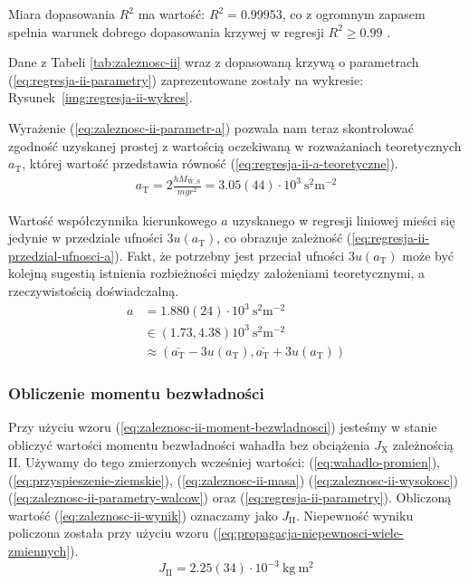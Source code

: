 \documentclass[twocolumn, a4paper, polish, 10pt]{article}
\newcommand{\JX}{\ensuremath{ J_{\mathrm{X}} }}
\newcommand{\JXn}[1]{\ensuremath{ J_{\mathrm{#1}} }}
\newcommand{\MWS}{\ensuremath{ M_{\mathrm{W,S}} }}
\begin{document}
Miara dopasowania $R^2$ ma wartość: $R^2 = 0.99953$, co z ogromnym zapasem spełnia warunek dobrego dopasowania krzywej w regresji $R^2 \geq 0.99$ \cite{epa-8000d}.

Dane z Tabeli \ref{tab:zaleznosc-ii} wraz z dopasowaną krzywą o parametrach (\ref{eq:regresja-ii-parametry}) zaprezentowane zostały na wykresie: Rysunek~\ref{img:regresja-ii-wykres}.


Wyrażenie (\ref{eq:zaleznosc-ii-parametr-a}) pozwala nam teraz skontrolować zgodność uzyskanej prostej z wartością oczekiwaną w rozważaniach teoretycznych $a_{\mathrm{T}}$, której wartość przedstawia równość (\ref{eq:regresja-ii-a-teoretyczne}).
\begin{equation}
\begin{split}
    a_{\mathrm{T}} = 2 \frac{h \MWS}{m g r^2} = 3.05(44) \cdot 10^3~\mathrm{ s^2 m^{-2} }
    \label{eq:regresja-ii-a-teoretyczne}
\end{split}
\end{equation}

Wartość współczynnika kierunkowego $a$ uzyskanego w regresji liniowej mieści się jedynie w przedziale ufności $3u(a_{\mathrm{T}})$, co obrazuje zależność (\ref{eq:regresja-ii-przedzial-ufnosci-a}). Fakt, że potrzebny jest przeciał ufności $3u(a_{\mathrm{T}})$ może być kolejną sugestią istnienia rozbieżności między założeniami teoretycznymi, a rzeczywistością doświadczalną.
\begin{equation}
\begin{split}
    a &= 1.880(24) \cdot 10^3~\mathrm{ s^2 m^{-2} } \\
    &\in \left( 1.73, 4.38 \right) 10^3~\mathrm{ s^2 m^{-2} } \\
    &\approx \left(
        \bar{a_{\mathrm{T}}} - 3 u(a_{\mathrm{T}}),
        \bar{a_{\mathrm{T}}} + 3 u(a_{\mathrm{T}})
    \right)
    \label{eq:regresja-ii-przedzial-ufnosci-a}
\end{split}
\end{equation}

\subsubsection{Obliczenie momentu bezwładności}
Przy użyciu wzoru (\ref{eq:zaleznosc-ii-moment-bezwladnosci}) jesteśmy w stanie obliczyć wartości momentu bezwładności wahadła bez obciążenia $\JX$ zależnością II. Używamy do tego zmierzonych wcześniej wartości: (\ref{eq:wahadlo-promien}),
(\ref{eq:przyspieszenie-ziemskie}),
(\ref{eq:zaleznosc-ii-masa})
(\ref{eq:zaleznosc-ii-wysokosc})
(\ref{eq:zaleznosc-ii-parametry-walcow}) oraz
(\ref{eq:regresja-ii-parametry}).
Obliczoną wartość (\ref{eq:zaleznosc-ii-wynik}) oznaczamy jako $\JXn{II}$. Niepewność wyniku policzona została przy użyciu wzoru (\ref{eq:propagacja-niepewnosci-wiele-zmiennych}).
\begin{equation}
    \JXn{II} = 2.25(34) \cdot 10^{-3}~\mathrm{kg~m^2}
    \label{eq:zaleznosc-ii-wynik}
\end{equation}
\end{document}
